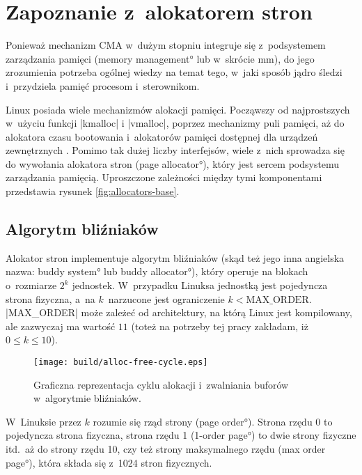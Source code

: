 \chapter{Zapoznanie z~alokatorem stron}

Ponieważ mechanizm CMA w~dużym stopniu integruje się z~podsystemem
zarządzania pamięci (\ang{memory management} lub w~skrócie mm), do
jego zrozumienia potrzeba ogólnej wiedzy na temat tego, w~jaki sposób
jądro śledzi i~przydziela pamięć procesom i~sterownikom.

Linux posiada wiele mechanizmów alokacji pamięci.  Począwszy od
najprostszych w~użyciu funkcji \code|kmalloc| i \code|vmalloc|,
poprzez mechanizmy puli pamięci, aż do alokatora czasu bootowania
i~alokatorów pamięci dostępnej dla urządzeń zewnętrznych
\autocite[rozdział 8]{bib:ldd3}.  Pomimo tak dużej liczby interfejsów,
wiele z~nich sprowadza się do wywołania alokatora stron (\ang{page
  allocator}), który jest sercem podsystemu zarządzania pamięcią.
Uproszczone zależności między tymi komponentami przedstawia rysunek
\ref{fig:allocators-base}.

\section{Algorytm bliźniaków}

Alokator stron implementuje algorytm bliźniaków (skąd też jego inna
angielska nazwa: \ang*{buddy system} lub \ang*{buddy allocator}),
który operuje na blokach o~rozmiarze $2^k$ jednostek.  W~przypadku
Linuksa jednostką jest pojedyncza strona fizyczna, a~na $k$~narzucone
jest ograniczenie $k < \mathrm{MAX\_ORDER}$.  \code|MAX_ORDER| może
zależeć od architektury, na którą Linux jest kompilowany, ale
zazwyczaj ma wartość $11$ (toteż na potrzeby tej pracy zakładam, iż $0
\le k \le 10$).

\begin{wrapfigure}{o}[1cm]{0.3\textwidth}
\begin{center}
\texttt{[image: build/alloc-free-cycle.eps]}
\end{center}
\caption[Zarządzanie pamięcią w~algorytmie bliźniaków]{Graficzna
  reprezentacja cyklu alokacji i~zwalniania buforów w~algorytmie
  bliźniaków.}
\end{wrapfigure}

W~Linuksie przez $k$ rozumie się rząd strony (\ang{page order}).
Strona rzędu 0 to pojedyncza strona fizyczna, strona rzędu 1
(\ang{1-order page}) to dwie strony fizyczne itd.\ aż do strony rzędu
10, czy też strony maksymalnego rzędu (\ang{max order page}), która
składa się z~1024 stron fizycznych.

